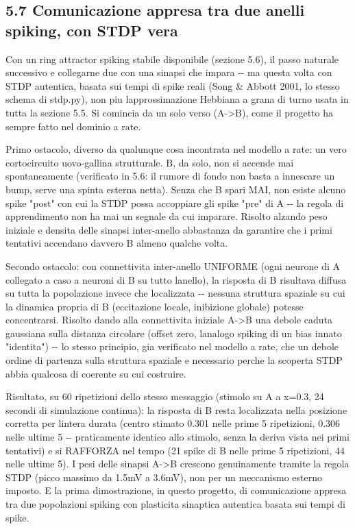 \documentclass[
  italian,
]{article}
\begin{document}

\subsection{5.7 Comunicazione appresa tra due anelli spiking, con STDP vera}\label{comunicazione-appresa-tra-due-anelli-spiking-con-stdp-vera}

Con un ring attractor spiking stabile disponibile (sezione 5.6), il passo naturale successivo e\textquotesingle{} collegarne due con una sinapsi che impara -\/- ma questa volta con STDP autentica, basata sui tempi di spike reali (Song \& Abbott 2001, lo stesso schema di stdp.py), non piu\textquotesingle{} l\textquotesingle approssimazione Hebbiana a grana di turno usata in tutta la sezione 5.5. Si comincia da un solo verso (A-\textgreater B), come il progetto ha sempre fatto nel dominio a rate.

Primo ostacolo, diverso da qualunque cosa incontrata nel modello a rate: un vero cortocircuito uovo-gallina strutturale. B, da solo, non si accende mai spontaneamente (verificato in 5.6: il rumore di fondo non basta a innescare un bump, serve una spinta esterna netta). Senza che B spari MAI, non esiste alcuno spike "post" con cui la STDP possa accoppiare gli spike "pre" di A -\/- la regola di apprendimento non ha mai un segnale da cui imparare. Risolto alzando peso iniziale e densita\textquotesingle{} delle sinapsi inter-anello abbastanza da garantire che i primi tentativi accendano davvero B almeno qualche volta.

Secondo ostacolo: con connettivita\textquotesingle{} inter-anello UNIFORME (ogni neurone di A collegato a caso a neuroni di B su tutto l\textquotesingle anello), la risposta di B risultava diffusa su tutta la popolazione invece che localizzata -\/- nessuna struttura spaziale su cui la dinamica propria di B (eccitazione locale, inibizione globale) potesse concentrarsi. Risolto dando alla connettivita\textquotesingle{} iniziale A-\textgreater B una debole caduta gaussiana sulla distanza circolare (offset zero, l\textquotesingle analogo spiking di un bias innato "identita\textquotesingle") -\/- lo stesso principio, gia\textquotesingle{} verificato nel modello a rate, che un debole ordine di partenza sulla struttura spaziale e\textquotesingle{} necessario perche\textquotesingle{} la scoperta STDP abbia qualcosa di coerente su cui costruire.

Risultato, su 60 ripetizioni dello stesso messaggio (stimolo su A a x=0.3, 24 secondi di simulazione continua): la risposta di B resta localizzata nella posizione corretta per l\textquotesingle intera durata (centro stimato 0.301 nelle prime 5 ripetizioni, 0.306 nelle ultime 5 -\/- praticamente identico allo stimolo, senza la deriva vista nei primi tentativi) e si RAFFORZA nel tempo (21 spike di B nelle prime 5 ripetizioni, 44 nelle ultime 5). I pesi delle sinapsi A-\textgreater B crescono genuinamente tramite la regola STDP (picco massimo da 1.5mV a 3.6mV), non per un meccanismo esterno imposto. E\textquotesingle{} la prima dimostrazione, in questo progetto, di comunicazione appresa tra due popolazioni spiking con plasticita\textquotesingle{} sinaptica autentica basata sui tempi di spike.
\end{document}
